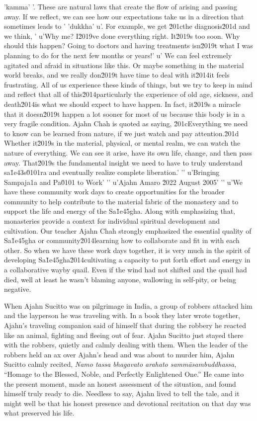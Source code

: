 'kamma'
'. These are natural laws that create the flow of arising and passing away. If we reflect, we can see how our expectations take us in a direction that sometimes leads to '
'dukkha'
u'. For example, we get \u201cthe diagnosis\u201d and we think, '
u'Why me? I\u2019ve done everything right. It\u2019s too soon. Why should this happen? Going to doctors and having treatments isn\u2019t what I was planning to do for the next few months or years!'
u' We can feel extremely agitated and afraid in situations like this. Or maybe something in the material world breaks, and we really don\u2019t have time to deal with it\u2014it feels frustrating. All of us experience these kinds of things, but we try to keep in mind and reflect that all of this\u2014particularly the experience of old age, sickness, and death\u2014is what we should expect to have happen. In fact, it\u2019s a miracle that it doesn\u2019t happen a lot sooner for most of us because this body is in a very fragile condition. Ajahn Chah is quoted as saying, \u201cEverything we need to know can be learned from nature, if we just watch and pay attention.\u201d Whether it\u2019s in the material, physical, or mental realm, we can watch the nature of everything. We can see it arise, have its own life, change, and then pass away. That\u2019s the fundamental insight we need to have to truly understand sa\u1e43s\u0101ra and eventually realize complete liberation.'
'\n'
u'Bringing Sampaja\xf1a and Pa\u0101 to Work'
'\n'
u'Ajahn Amaro \u2022 August 2005'
'\n'
u'We have these community work days to create opportunities for the broader community to help contribute to the material fabric of the monastery and to support the life and energy of the Sa\u1e45gha. Along with emphasizing that, monasteries provide a context for individual spiritual development and cultivation. Our teacher Ajahn Chah strongly emphasized the essential quality of Sa\u1e45gha or community\u2014learning how to collaborate and fit in with each other. So when we have these work days together, it is very much in the spirit of developing Sa\u1e45gha\u2014cultivating a capacity to put forth effort and energy in a collaborative wayby quail. Even if the wind had not shifted and the quail had died, 
well at least he wasn't blaming anyone, wallowing in self-pity, or 
being negative.

When Ajahn Sucitto was on pilgrimage in India, a group of robbers 
attacked him and the layperson he was traveling with. In a book they 
later wrote together, Ajahn's traveling companion said of himself that 
during the robbery he reacted like an animal, fighting and fleeing out 
of fear. Ajahn Sucitto just stayed there with the robbers, quietly and 
calmly dealing with them. When the leader of the robbers held an ax 
over Ajahn's head and was about to murder him, Ajahn Sucitto calmly 
recited, \emph{Namo tassa bhagavato arahato sammāsambuddhassa}, 
``Homage to the Blessed, Noble, and Perfectly Enlightened One.'' He 
came into the present moment, made an honest assessment of the 
situation, and found himself truly ready to die. Needless to say, Ajahn 
lived to tell the tale, and it might well be that his honest presence 
and devotional recitation on that day was what preserved his life.

